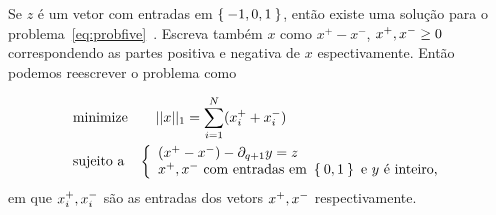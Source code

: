 Se $z$ é um vetor com entradas em $\Set{-1,0,1}$, então existe uma solução para o 
problema~\eqref{eq:probfive}~\cite{Dey2010}. Escreva também $x$ como 
$x^+ - x^-$, $x^+, x^- \geq 0$ correspondendo as partes positiva e negativa
de $x$ espectivamente. Então podemos reescrever o problema como 

\begin{equation*}
    \begin{split}
        &\text{minimize} \quad \quad ||x||_1 = \sum_{i=1}^N (x^+_i + x^-_i) \\
        &\text{sujeito a} \quad \left \{ \begin{array}{l}
            (x^+ - x^-) - \partial_{q+1} y = z \\
            x^+, x^- \text{ com entradas em } \Set{0,1} \text{ e } 
            y \text{ é inteiro,}
        \end{array} \right.
    \end{split}
\end{equation*}
em que $x^+_i, x^-_i$ são as entradas dos vetors $x^+, x^-$ respectivamente.

